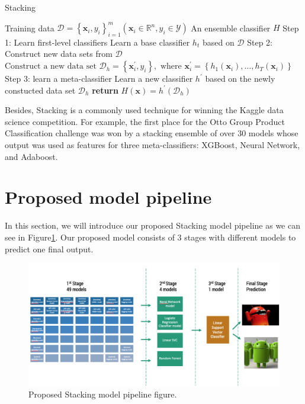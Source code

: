 \begin{algorithm}[htbp]
    \centering
    \caption{Stacking}
    \label{alg:algo1}
    \begin{algorithmic}[1]  
    \renewcommand{\algorithmicrequire}{\textbf{Input:}}
    \renewcommand{\algorithmicensure}{\textbf{Output:}}
    \Require Training data $\mathcal{D}=\left\{\mathbf{x}_{i}, y_{i}\right\}_{i=1}^{m}\left(\mathbf{x}_{i} \in \mathbb{R}^{n}, y_{i} \in \mathcal{Y}\right)$
    \Ensure An ensemble classifier $H$
    \State Step 1: Learn first-level classifiers
        \Statex Learn a base classifier $h_{t}$ based on $\mathcal{D}$
    \EndFor
    \State Step 2: Construct new data sets from $\mathcal{D}$
    \State $\text{Construct a new data set }\mathcal{D}_{h}=\left\{\mathbf{x}_{i}^{\prime}, y_{i}\right\}, \text { where } \mathbf{x}_{i}^{\prime}=\left\{h_{1}\left(\mathbf{x}_{i}\right), \ldots, h_{T}\left(\mathbf{x}_{i}\right)\right\}$
    \EndFor
    \State Step 3: learn a meta-classifier
    \State Learn a new classifier $h^{\prime}$ based on the newly constucted data set $\mathcal{D}_h$
    \State \textbf{return} $H(\mathbf{x})=h^{\prime}\left(\mathcal{D}_h\right)$
    \end{algorithmic}
\end{algorithm}

Besides, Stacking is a commonly used technique for winning the Kaggle data science competition. For example, the first place for the Otto Group Product Classification challenge was won by a stacking ensemble of over 30 models whose output was used as features for three meta-classifiers: XGBoost, Neural Network, and Adaboost.

\section{Proposed model pipeline}

In this section, we will introduce our proposed Stacking model pipeline as we can see in Figure\ref{fig:modelpipeline}. Our proposed model consists of 3 stages with different models to predict one final output.

\begin{figure}[htbp]
    \centering
    \includegraphics[width=\textwidth]{./Figure/modelpipeline.png}
    \caption{Proposed Stacking model pipeline figure.}
    \label{fig:modelpipeline}
\end{figure}

